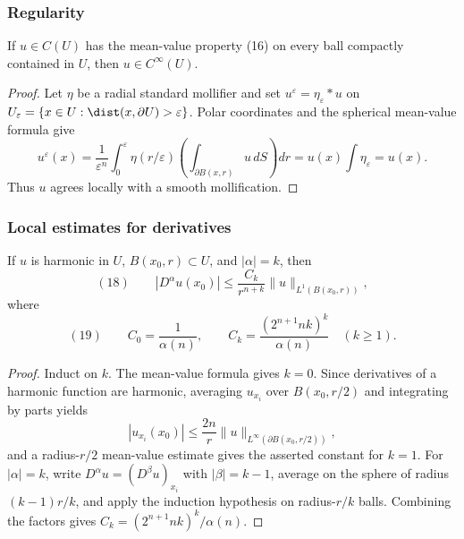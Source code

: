 \subsubsection{Regularity}
\label{sec:laplace-regularity}

\begin{theorem}[Smoothness]
\label{thm:harmonic-functions-smooth}
\leanok
If $u\in C(U)$ has the mean-value property (16) on every ball compactly
contained in $U$, then $u\in C^\infty(U)$.
\end{theorem}
\begin{proof}
\leanok
\sketch Let $\eta$ be a radial standard mollifier and set
$u^\varepsilon=\eta_\varepsilon*u$ on
$U_\varepsilon=\{x\in U:\dist(x,\partial U)>\varepsilon\}$. Polar
coordinates and the spherical mean-value formula give
$$u^\varepsilon(x)
=\frac1{\varepsilon^n}\int_0^\varepsilon
\eta(r/\varepsilon)\left(\int_{\partial B(x,r)}u\,dS\right)dr
=u(x)\int\eta_\varepsilon=u(x).$$
Thus $u$ agrees locally with a smooth mollification.
\end{proof}

\subsubsection{Local estimates for derivatives}
\label{sec:laplace-local-estimates-derivatives}

\begin{theorem}
\label{thm:harmonic-function-derivative-estimates}
If $u$ is harmonic in $U$, $B(x_0,r)\subset U$, and $|\alpha|=k$, then
$$(18)\qquad
|D^\alpha u(x_0)|\le
\frac{C_k}{r^{n+k}}\|u\|_{L^1(B(x_0,r))},$$
where
$$(19)\qquad
C_0=\frac1{\alpha(n)},
\qquad
C_k=\frac{(2^{n+1}nk)^k}{\alpha(n)}\quad(k\ge1).$$
\end{theorem}
\begin{proof}
\sketch Induct on $k$. The mean-value formula gives $k=0$. Since derivatives
of a harmonic function are harmonic, averaging $u_{x_i}$ over $B(x_0,r/2)$
and integrating by parts yields
$$|u_{x_i}(x_0)|\le\frac{2n}{r}
\|u\|_{L^\infty(\partial B(x_0,r/2))},$$
and a radius-$r/2$ mean-value estimate gives the asserted constant for $k=1$.
For $|\alpha|=k$, write $D^\alpha u=(D^\beta u)_{x_i}$ with
$|\beta|=k-1$, average on the sphere of radius $(k-1)r/k$, and apply the
induction hypothesis on radius-$r/k$ balls. Combining the factors gives
$C_k=(2^{n+1}nk)^k/\alpha(n)$.
\end{proof}

